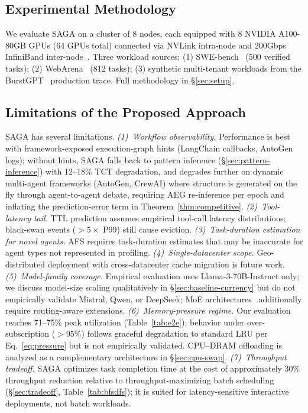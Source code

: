 \documentclass[sigconf]{acmart}
\newcommand{\sysname}{SAGA\xspace}
\begin{document}
\subsection{Experimental Methodology}
\label{sec:methodology-intro}

We evaluate \sysname on a cluster of 8 nodes, each equipped with 8 NVIDIA A100-80GB GPUs (64 GPUs total) connected via NVLink intra-node and 200Gbps InfiniBand inter-node~\cite{nvidia2018nvlink,infiniband2020}. Three workload sources: (1) SWE-bench~\cite{jimenez2024swebench} (500 verified tasks); (2) WebArena~\cite{zhou2024webarena} (812 tasks); (3) synthetic multi-tenant workloads from the BurstGPT~\cite{wang2024burstgpt} production trace. Full methodology in \S\ref{sec:setup}.

\subsection{Limitations of the Proposed Approach}
\label{sec:limitations-approach}

\sysname has several limitations. \emph{(1)~Workflow observability.} Performance is best with framework-exposed execution-graph hints (LangChain callbacks, AutoGen logs); without hints, \sysname falls back to pattern inference (\S\ref{sec:pattern-inference}) with 12--18\% TCT degradation, and degrades further on dynamic multi-agent frameworks (AutoGen, CrewAI) where structure is generated on the fly through agent-to-agent debate, requiring AEG re-inference per epoch and inflating the prediction-error term in Theorem~\ref{thm:competitive}. \emph{(2)~Tool-latency tail.} TTL prediction assumes empirical tool-call latency distributions; black-swan events ($>5\times$ P99) still cause eviction. \emph{(3)~Task-duration estimation for novel agents.} AFS requires task-duration estimates that may be inaccurate for agent types not represented in profiling. \emph{(4)~Single-datacenter scope.} Geo-distributed deployment with cross-datacenter cache migration is future work. \emph{(5)~Model-family coverage.} Empirical evaluation uses Llama-3-70B-Instruct only; we discuss model-size scaling qualitatively in \S\ref{sec:baseline-currency} but do not empirically validate Mistral, Qwen, or DeepSeek; MoE architectures~\cite{fedus2022switch} additionally require routing-aware extensions. \emph{(6)~Memory-pressure regime.} Our evaluation reaches 71--75\% peak utilization (Table~\ref{tab:e2e}); behavior under over-subscription ($>$95\%) follows graceful degradation to standard LRU per Eq.~\ref{eq:pressure} but is not empirically validated. CPU--DRAM offloading is analyzed as a complementary architecture in \S\ref{sec:cpu-swap}. \emph{(7)~Throughput tradeoff.} \sysname optimizes task completion time at the cost of approximately 30\% throughput reduction relative to throughput-maximizing batch scheduling (\S\ref{sec:tradeoff}, Table~\ref{tab:bfsdfs}); it is suited for latency-sensitive interactive deployments, not batch workloads.
\end{document}
